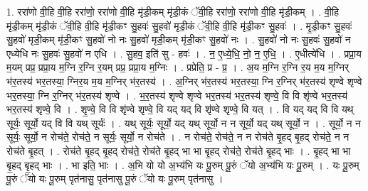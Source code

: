 \documentclass[17pt]{extarticle}
\begin{document}
1. ररा॑णो वी॒हि वी॒हि ररा॑णो॒ ररा॑णो वी॒हि मृ॑डी॒कम् मृ॑डी॒कं ॅवी॒हि ररा॑णो॒ ररा॑णो वी॒हि मृ॑डी॒कम् । . वी॒हि मृ॑डी॒कम् मृ॑डी॒कं ॅवी॒हि वी॒हि मृ॑डी॒कꣳ सु॒हवः॑ सु॒हवो॑ मृडी॒कं ॅवी॒हि वी॒हि मृ॑डी॒कꣳ सु॒हवः॑ । . मृ॒डी॒कꣳ सु॒हवः॑ सु॒हवो॑ मृडी॒कम् मृ॑डी॒कꣳ सु॒हवो॑ नो नः सु॒हवो॑ मृडी॒कम् मृ॑डी॒कꣳ सु॒हवो॑ नः । . सु॒हवो॑ नो नः सु॒हवः॑ सु॒हवो॑ न एध्येधि नः सु॒हवः॑ सु॒हवो॑ न एधि । . सु॒हव॒ इति॑ सु - हवः॑ । . न॒ ए॒ध्ये॒धि॒ नो॒ न॒ ए॒धि॒ । . ए॒धीत्ये॑धि । . प्रप्रा॒य म॒यम् प्रप्र॒ प्रप्रा॒य म॒ग्नि र॒ग्नि र॒यम् प्रप्र॒ प्रप्रा॒य म॒ग्निः । . प्रप्रेति॒ प्र - प्र॒ । . अ॒य म॒ग्नि र॒ग्नि र॒य म॒य म॒ग्निर् भ॑र॒तस्य॑ भर॒तस्या॒ ग्निर॒य म॒य म॒ग्निर् भ॑र॒तस्य॑ । . अ॒ग्निर् भ॑र॒तस्य॑ भर॒तस्या॒ ग्नि र॒ग्निर् भ॑र॒तस्य॑ शृण्वे शृण्वे भर॒तस्या॒ ग्नि र॒ग्निर् भ॑र॒तस्य॑ शृण्वे । . भ॒र॒तस्य॑ शृण्वे शृण्वे भर॒तस्य॑ भर॒तस्य॑ शृण्वे॒ वि वि शृ॑ण्वे भर॒तस्य॑ भर॒तस्य॑ शृण्वे॒ वि । . शृ॒ण्वे॒ वि वि शृ॑ण्वे शृण्वे॒ वि यद् यद् वि शृ॑ण्वे शृण्वे॒ वि यत् । . वि यद् यद् वि वि यथ् सूर्यः॒ सूर्यो॒ यद् वि वि यथ् सूर्यः॑ । . यथ् सूर्यः॒ सूर्यो॒ यद् यथ् सूर्यो॒ न न सूर्यो॒ यद् यथ् सूर्यो॒ न । . सूर्यो॒ न न सूर्यः॒ सूर्यो॒ न रोच॑ते॒ रोच॑ते॒ न सूर्यः॒ सूर्यो॒ न रोच॑ते । . न रोच॑ते॒ रोच॑ते॒ न न रोच॑ते बृ॒हद् बृ॒हद् रोच॑ते॒ न न रोच॑ते बृ॒हत् । . रोच॑ते बृ॒हद् बृ॒हद् रोच॑ते॒ रोच॑ते बृ॒हद् भा भा बृ॒हद् रोच॑ते॒ रोच॑ते बृ॒हद् भाः । . बृ॒हद् भा भा बृ॒हद् बृ॒हद् भाः । . भा इति॒ भाः । . अ॒भि यो यो अ॒भ्य॑भि यः पू॒रुम् पू॒रुं ॅयो अ॒भ्य॑भि यः पू॒रुम् । . यः पू॒रुम् पू॒रुं ॅयो यः पू॒रुम् पृत॑नासु॒ पृत॑नासु पू॒रुं ॅयो यः पू॒रुम् पृत॑नासु । \newline
\end{document}
